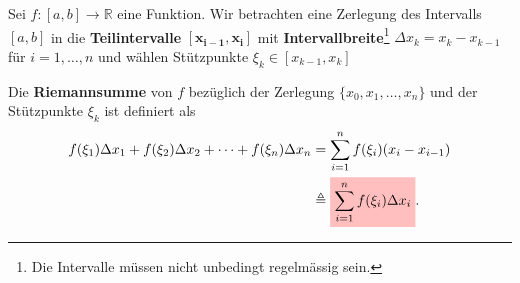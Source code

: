 \documentclass[12pt]{article}
\newcommand{\R}{\mathbb{R}} %
\newenvironment{definition}[2][Definition]{\begin{trivlist}
        \item[\hskip \labelsep {\bfseries #1}\hskip \labelsep {\bfseries #2.}]}{\flushright{$\square$}\end{trivlist}}
\begin{document}
\begin{definition}{[Riemannsumme und Riemannintegral]}
    Sei $f: [a,b] \to \R$ eine Funktion. Wir betrachten eine Zerlegung des Intervalls $[a,b]$ in die \textbf{Teilintervalle} $\mathbf{[x_{i-1},x_i]}$ mit \textbf{Intervallbreite}\footnote{Die Intervalle müssen nicht unbedingt regelmässig sein.} $\Delta x_k=x_k-x_{k-1}$ für $i=1,\ldots,n$ und wählen Stützpunkte $\xi_k\in[x_{k-1},x_k]$

    Die \textbf{Riemannsumme} von $f$ bezüglich der Zerlegung
    $\{x_0,x_1,\ldots,x_n\}$ und der Stützpunkte $\xi_k$ ist definiert als
    \begin{align}
        f(\xi_1)\Delta x_1+f(\xi_2)\Delta x_2 + \cdots + f(\xi_n)\Delta x_n & =\sum_{i=1}^{n}f(\xi_i)(x_i-x_{i-1}) \\ &\triangleq\colorbox{pink}{\mathstrut$\displaystyle\sum_{i=1}^{n}f(\xi_i)\Delta x_i$}.
    \end{align}
    \begin{figure}[htbp]
        \centering
\end{figure}
\end{definition}
\end{document}
